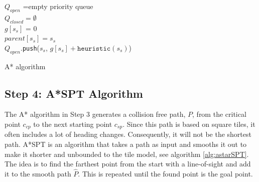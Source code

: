 \begin{algorithm}[H]
\SetAlgoLined
{}
$Q_{open}$ =\textup{empty priority queue} \\
$Q_{closed} = \emptyset$ \\
$g[s_{s}]$ = 0 \\
$parent[s_{s}] = s_{s} $\\
$Q_{open}$.\texttt{push}($s_{s}$, $g[s_{s}] + \texttt{heuristic}(s_{s})$)\\
\caption{\textup{A* algorithm}}
\label{alg:astar}
\end{algorithm}

\subsection{Step 4: A*SPT Algorithm}
The A* algorithm in Step 3 generates a collision free path, $P$, from the critical point $c_{cp}$ to the next starting point $c_{sp}$. Since this path is based on square tiles, it often includes a lot of heading changes. Consequently, it will not be the shortest path. A*SPT is an algorithm that takes a path as input and smooths it out to make it shorter and unbounded to the tile model, see algorithm \ref{alg:astarSPT}. The idea is to find the farthest point from the start with a line-of-sight and add it to the smooth path $\hat{P}$. This is repeated until the found point is the goal point.

